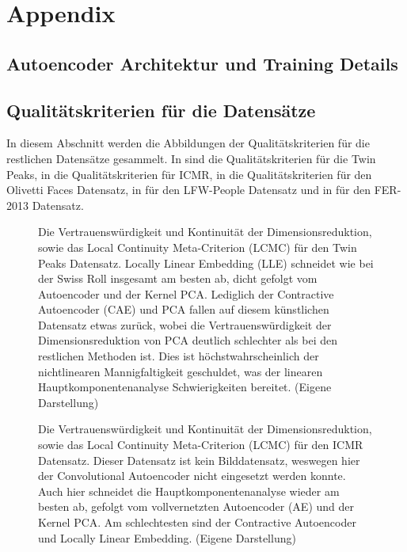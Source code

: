 
\chapter{Appendix}
\label{ch:Appendix}

\section{Autoencoder Architektur und Training Details}
\label{ch:Appendix:Architektur-Details}

\section{Qualitätskriterien für die Datensätze}
\label{ch:Appendix:Qualitaetskriterien}

In diesem Abschnitt werden die Abbildungen der Qualitätskriterien für die restlichen Datensätze
gesammelt. In  sind die Qualitätskriterien für die Twin Peaks, in
 die Qualitätskriterien für ICMR, in  die
Qualitätskriterien für den Olivetti Faces Datensatz, in  für den
LFW-People Datensatz und in  für den FER-2013 Datensatz.
\begin{figure}[ht]
	\begin{center}
		
	\end{center}
	\caption[Twin Peaks Qualitätskriterien]{Die Vertrauenswürdigkeit und Kontinuität der Dimensionsreduktion, sowie das Local Continuity Meta-Criterion (LCMC) für den Twin Peaks Datensatz. Locally Linear Embedding (LLE) schneidet wie bei der Swiss Roll insgesamt am besten ab, dicht gefolgt vom Autoencoder und der Kernel PCA. Lediglich der Contractive Autoencoder (CAE) und PCA fallen auf diesem künstlichen Datensatz etwas zurück, wobei die Vertrauenswürdigkeit der Dimensionsreduktion von PCA deutlich schlechter als bei den restlichen Methoden ist. Dies ist höchstwahrscheinlich der nichtlinearen Mannigfaltigkeit geschuldet, was der linearen Hauptkomponentenanalyse Schwierigkeiten bereitet. (Eigene Darstellung)}
	\label{fig:TwinPeaksMetrics}
\end{figure}

\begin{figure}[ht]
	\begin{center}
		
	\end{center}
	\caption[ICMR Qualitätskriterien]{Die Vertrauenswürdigkeit und Kontinuität der Dimensionsreduktion, sowie das Local Continuity Meta-Criterion (LCMC) für den ICMR Datensatz. Dieser Datensatz ist kein Bilddatensatz, weswegen hier der Convolutional Autoencoder nicht eingesetzt werden konnte. Auch hier schneidet die Hauptkomponentenanalyse wieder am besten ab, gefolgt vom vollvernetzten Autoencoder (AE) und der Kernel PCA. Am schlechtesten sind der Contractive Autoencoder und Locally Linear Embedding. (Eigene Darstellung)}
	\label{fig:ICMRMetrics}
\end{figure}

